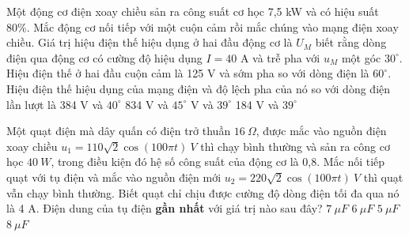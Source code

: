 \begin{vidu} %
	Một động cơ điện xoay chiều sản ra công suất cơ học 7,5 kW và có hiệu suất 80\%. Mắc động cơ nối tiếp với một cuộn cảm rồi mắc chúng vào mạng điện xoay chiều. Giá trị hiệu điện thế hiệu dụng ở hai đầu động cơ là $U_M$ biết rằng dòng điện qua động cơ có cường độ hiệu dụng $I = 40$ A và trễ pha với $u_M$ một góc $30^\circ$. Hiệu điện thế ở hai đầu cuộn cảm là 125 V và sớm pha so với dòng điện là $60^ \circ$. Hiệu điện thế hiệu dụng của mạng điện và độ lệch pha của nó so với dòng điện lần lượt là
	\choice
	{384 V và $40^\circ$}
	{834 V và $45^\circ$}
	{ V và $39^\circ$}
	{184 V và $39^\circ$}
\end{vidu}
\begin{vidu} %
	Một quạt điện mà dây quấn có điện trở thuần $16\ \Omega$, được mắc vào nguồn điện xoay chiều $u_1=110\sqrt{2}\cos\left(100\pi t\right)\ V$ thì chạy bình thường và sản ra công cơ học $40\ W$, trong điều kiện đó hệ số công suất của động cơ là 0,8. Mắc nối tiếp quạt với tụ điện và mắc vào nguồn điện mới $u_2=220\sqrt{2}\cos\left(100\pi t\right)\ V$ thì quạt vẫn chạy bình thường. Biết quạt chỉ chịu được cường độ dòng điện tối đa qua nó là 4 A. Điện dung của tụ điện \textbf{gần nhất} với giá trị nào sau đây?
	\choice
	{$7\ \mu F$}
	{\True $6\ \mu F$}
	{$5\ \mu F$}
	{$8\ \mu F$}
\end{vidu}
